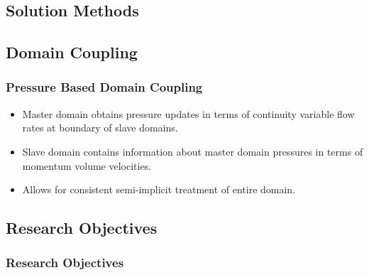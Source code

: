 \documentclass[compress,xcolor=table]{beamer}
\begin{document}
\subsection[Solution Methods]{Solution Methods}

\subsection[Domain Coupling]{Domain Coupling}
\begin{frame}
\frametitle{Pressure Based Domain Coupling}

\begin{itemize}
\item{Master domain obtains pressure updates in terms of continuity variable flow rates at boundary of slave domains.}
\item{Slave domain contains information about master domain pressures in terms of momentum volume velocities.}
\item{Allows for consistent semi-implicit treatment of entire domain.}
\end{itemize}

\end{frame}
\subsection[Research Objectives]{Research Objectives}

\begin{frame}
\frametitle{Research Objectives}

\begin{figure}[t]
\centering
\resizebox{!}{0.7\textheight}{

}
\end{figure}

\end{frame}
\end{document}
